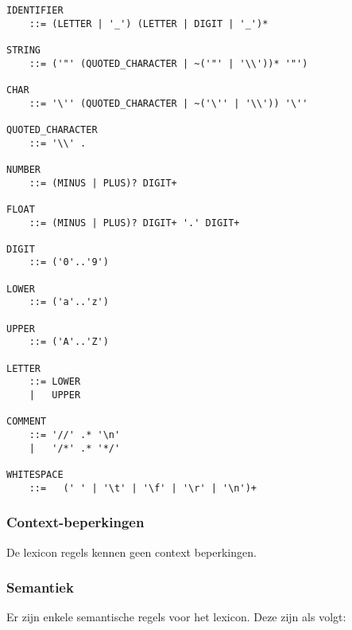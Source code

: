 \begin{lstlisting}
IDENTIFIER
	::=	(LETTER | '_') (LETTER | DIGIT | '_')*

STRING
	::=	('"' (QUOTED_CHARACTER | ~('"' | '\\'))* '"')

CHAR
	::=	'\'' (QUOTED_CHARACTER | ~('\'' | '\\')) '\''

QUOTED_CHARACTER
	::=	'\\' .

NUMBER
	::=	(MINUS | PLUS)? DIGIT+

FLOAT
	::=	(MINUS | PLUS)? DIGIT+ '.' DIGIT+

DIGIT
	::=	('0'..'9')

LOWER
	::=	('a'..'z')

UPPER
	::=	('A'..'Z')

LETTER
	::=	LOWER
	|	UPPER

COMMENT
	::=	'//' .* '\n' 
	|	'/*' .* '*/'

WHITESPACE
	::=   (' ' | '\t' | '\f' | '\r' | '\n')+
\end{lstlisting}

\subsubsection{Context-beperkingen}
De lexicon regels kennen geen context beperkingen.

\subsubsection{Semantiek}
Er zijn enkele semantische regels voor het lexicon. Deze zijn als volgt:

